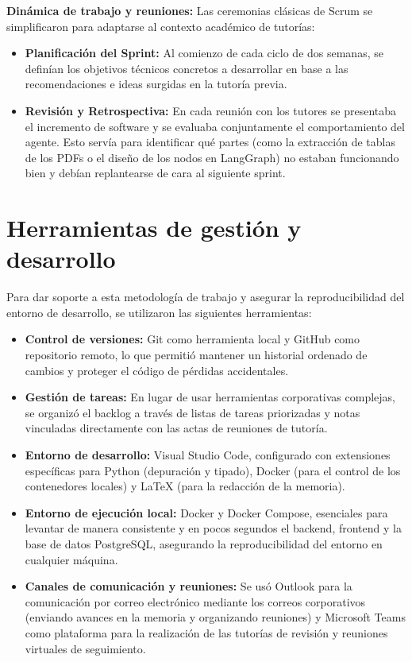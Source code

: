 \documentclass[12pt,a4paper,oneside]{report}
\begin{document}
\textbf{Dinámica de trabajo y reuniones:} Las ceremonias clásicas de Scrum se simplificaron para adaptarse al contexto académico de tutorías:
\begin{itemize}
    \item \textbf{Planificación del Sprint:} Al comienzo de cada ciclo de dos semanas, se definían los objetivos técnicos concretos a desarrollar en base a las recomendaciones e ideas surgidas en la tutoría previa.
    \item \textbf{Revisión y Retrospectiva:} En cada reunión con los tutores se presentaba el incremento de software y se evaluaba conjuntamente el comportamiento del agente. Esto servía para identificar qué partes (como la extracción de tablas de los PDFs o el diseño de los nodos en LangGraph) no estaban funcionando bien y debían replantearse de cara al siguiente sprint.
\end{itemize}

\section{Herramientas de gestión y desarrollo}

Para dar soporte a esta metodología de trabajo y asegurar la reproducibilidad del entorno de desarrollo, se utilizaron las siguientes herramientas:
\begin{itemize}
    \item \textbf{Control de versiones:} Git como herramienta local y GitHub como repositorio remoto, lo que permitió mantener un historial ordenado de cambios y proteger el código de pérdidas accidentales.
    \item \textbf{Gestión de tareas:} En lugar de usar herramientas corporativas complejas, se organizó el backlog a través de listas de tareas priorizadas y notas vinculadas directamente con las actas de reuniones de tutoría.
    \item \textbf{Entorno de desarrollo:} Visual Studio Code, configurado con extensiones específicas para Python (depuración y tipado), Docker (para el control de los contenedores locales) y LaTeX (para la redacción de la memoria).
    \item \textbf{Entorno de ejecución local:} Docker y Docker Compose, esenciales para levantar de manera consistente y en pocos segundos el backend, frontend y la base de datos PostgreSQL, asegurando la reproducibilidad del entorno en cualquier máquina.
    \item \textbf{Canales de comunicación y reuniones:} Se usó Outlook para la comunicación por correo electrónico mediante los correos corporativos (enviando avances en la memoria y organizando reuniones) y Microsoft Teams como plataforma para la realización de las tutorías de revisión y reuniones virtuales de seguimiento.
\end{itemize}
\end{document}
